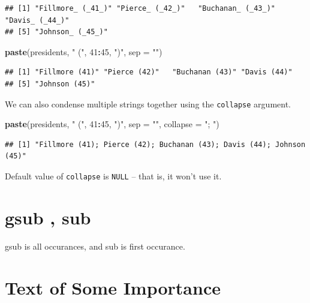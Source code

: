 \documentclass[
]{book}
\newenvironment{Shaded}{\begin{snugshade}}{\end{snugshade}}
\newcommand{\DataTypeTok}[1]{\textcolor[rgb]{0.13,0.29,0.53}{#1}}
\newcommand{\DecValTok}[1]{\textcolor[rgb]{0.00,0.00,0.81}{#1}}
\newcommand{\KeywordTok}[1]{\textcolor[rgb]{0.13,0.29,0.53}{\textbf{#1}}}
\newcommand{\NormalTok}[1]{#1}
\newcommand{\OperatorTok}[1]{\textcolor[rgb]{0.81,0.36,0.00}{\textbf{#1}}}
\newcommand{\StringTok}[1]{\textcolor[rgb]{0.31,0.60,0.02}{#1}}
\begin{document}
\begin{verbatim}
## [1] "Fillmore_ (_41_)" "Pierce_ (_42_)"   "Buchanan_ (_43_)" "Davis_ (_44_)"   
## [5] "Johnson_ (_45_)"
\end{verbatim}

\begin{Shaded}
\begin{Highlighting}[]
\KeywordTok{paste}\NormalTok{(presidents, }\StringTok{" ("}\NormalTok{, }\DecValTok{41}\OperatorTok{:}\DecValTok{45}\NormalTok{, }\StringTok{")"}\NormalTok{, }\DataTypeTok{sep =} \StringTok{""}\NormalTok{)}
\end{Highlighting}
\end{Shaded}

\begin{verbatim}
## [1] "Fillmore (41)" "Pierce (42)"   "Buchanan (43)" "Davis (44)"   
## [5] "Johnson (45)"
\end{verbatim}

We can also condense multiple strings together using the \texttt{collapse} argument.

\begin{Shaded}
\begin{Highlighting}[]
\KeywordTok{paste}\NormalTok{(presidents, }\StringTok{" ("}\NormalTok{, }\DecValTok{41}\OperatorTok{:}\DecValTok{45}\NormalTok{, }\StringTok{")"}\NormalTok{, }\DataTypeTok{sep =} \StringTok{""}\NormalTok{, }\DataTypeTok{collapse =} \StringTok{"; "}\NormalTok{)}
\end{Highlighting}
\end{Shaded}

\begin{verbatim}
## [1] "Fillmore (41); Pierce (42); Buchanan (43); Davis (44); Johnson (45)"
\end{verbatim}

Default value of \texttt{collapse} is \texttt{NULL} -- that is, it won't use it.

\hypertarget{gsub-sub}{%
\section{gsub , sub}\label{gsub-sub}}

gsub is all occurances, and sub is first occurance.

\hypertarget{text-of-some-importance}{%
\section{Text of Some Importance}\label{text-of-some-importance}}
\end{document}
